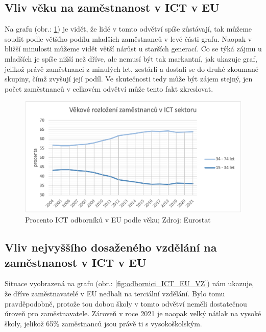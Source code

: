\documentclass[12pt]{report}			%
\begin{document}
            
            \subsection{Vliv věku na zaměstnanost v ICT v EU}
            
                Na grafu (obr.: \ref{fig:odbornici_ICT_EU_vek}) je vidět, že lidé v tomto odvětví spíše zůstávají, tak můžeme soudit podle většího podílu mladších zaměstnanců v levé části grafu. Naopak v bližší minulosti můžeme vidět větší nárůst u starších generací. Co se týká zájmu u mladších je spíše nižší než dříve, ale nemusí být tak markantní, jak ukazuje graf, jelikož právě zaměstnanci z minulých let, zestárli a dostali se do druhé zkoumané skupiny, čímž zvyšují její podíl. Ve skutečnosti tedy může být zájem stejný, jen počet zaměstnanců v celkovém odvětví může tento fakt zkreslovat. \cite{EmployedICTSpecialistsByAge}
                
                \begin{figure}[h]
                    \centering
                    \includegraphics[width=16cm]{Maturitni Prace/images/odbornici_ICT_EU_vek.png} 
                    \caption[Procento ICT odborníků v EU podle věku 2004/21]{Procento ICT odborníků v EU podle věku; Zdroj: Eurostat}
                    \label{fig:odbornici_ICT_EU_vek}
                \end{figure}
                
            
            \subsection{Vliv nejvyššího dosaženého vzdělání na zaměstnanost v ICT v EU}
            
                Situace vyobrazená na grafu (obr.: \ref{fig:odbornici_ICT_EU_VZ}) nám ukazuje, že dříve zaměstnavatelé v EU nedbali na terciální vzdělání. Bylo tomu pravděpodobně, protože tou dobou školy v tomto odvětví neměli dostatečnou úroveň pro zaměstnavatele. Zároveň v roce 2021 je naopak velký nátlak na vysoké školy, jelikož 65\% zaměstnanců jsou právě ti s vysokoškolským.\cite{EmployedICTSpecialistsByEducationalAttainmentLevel}
\end{document}
